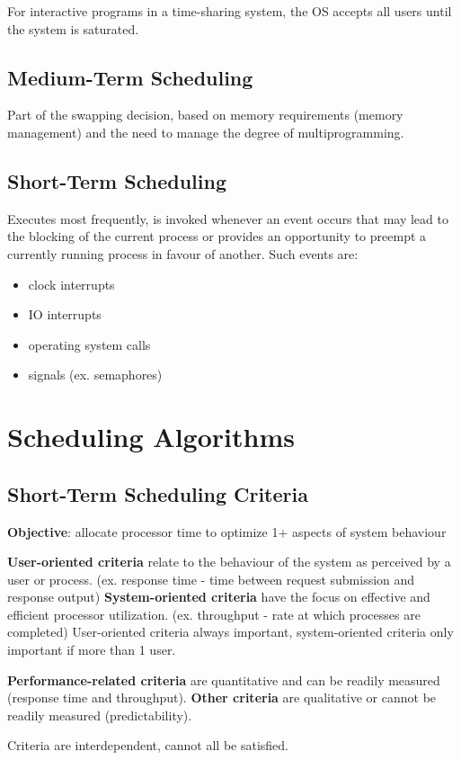 \documentclass[11pt]{article}
\begin{document}
For interactive programs in a time-sharing system, the OS accepts all users until the
system is saturated.
\subsection{Medium-Term Scheduling}
\label{sec:org0c46e28}
Part of the swapping decision, based on memory requirements (memory management) and the
need to manage the degree of multiprogramming.
\subsection{Short-Term Scheduling}
\label{sec:org0dd9ffd}
Executes most frequently, is invoked whenever an event occurs that may lead to the
blocking of the current process or provides an opportunity to preempt a currently
running process in favour of another.
Such events are:
\begin{itemize}
\item clock interrupts
\item IO interrupts
\item operating system calls
\item signals (ex. semaphores)
\end{itemize}
\section{Scheduling Algorithms}
\label{sec:org1e3e68b}
\subsection{Short-Term Scheduling Criteria}
\label{sec:org848978e}
\textbf{Objective}: allocate processor time to optimize 1+ aspects of system behaviour

\textbf{User-oriented criteria} relate to the behaviour of the system as perceived by a user
or process. (ex. response time - time between request submission and response output)
\textbf{System-oriented criteria} have the focus on effective and efficient processor
utilization. (ex. throughput - rate at which processes are completed)
User-oriented criteria always important, system-oriented criteria only important if
more than 1 user.

\textbf{Performance-related criteria} are quantitative and can be readily measured (response
time and throughput). \textbf{Other criteria} are qualitative or cannot be readily measured
(predictability).

Criteria are interdependent, cannot all be satisfied.
\end{document}
